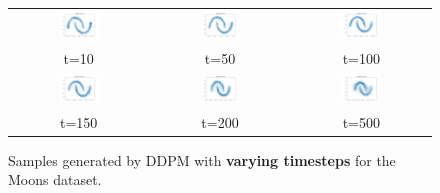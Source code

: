 \documentclass[11pt]{article}
\begin{document}
\begin{figure}[H]
    \centering
    \begin{tabular}{ccc}
        \includegraphics[width=0.3\textwidth]{exps/ddpm_2_10_0.0001_0.02_moons/samples_10.png} &
        \includegraphics[width=0.3\textwidth]{exps/ddpm_2_50_0.0001_0.02_moons/samples_50.png} &
        \includegraphics[width=0.3\textwidth]{exps/ddpm_2_100_0.0001_0.02_moons/samples_100.png} \\
        t=10 & t=50 & t=100 \\[0.5em]
        
        \includegraphics[width=0.3\textwidth]{exps/ddpm_2_150_0.0001_0.02_moons/samples_150.png} &
        \includegraphics[width=0.3\textwidth]{exps/ddpm_2_200_0.0001_0.02_moons/samples_200.png} &
        \includegraphics[width=0.3\textwidth]{exps/ddpm_2_500_0.0001_0.02_moons/samples_500.png} \\
        t=150 & t=200 & t=500 \\
    \end{tabular}
    \caption{Samples generated by DDPM with \textbf{varying timesteps} for the Moons dataset.}
    \label{fig:timesteps_moons}
\end{figure}
\end{document}

